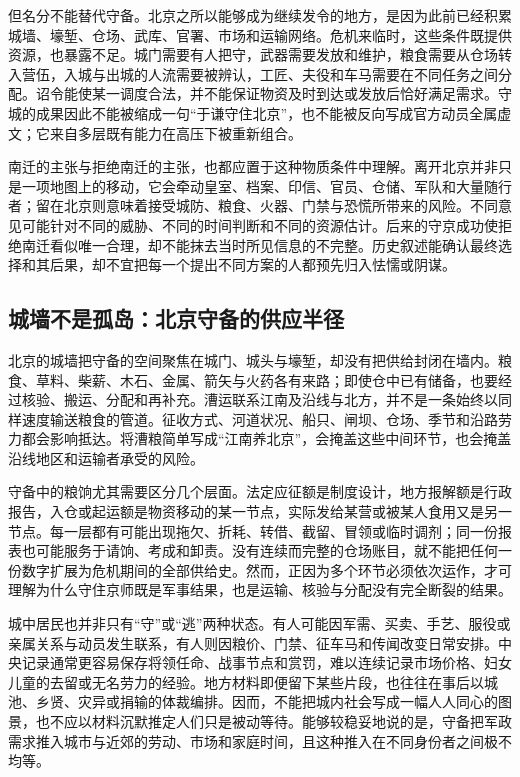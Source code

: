 但名分不能替代守备。北京之所以能够成为继续发令的地方，是因为此前已经积累城墙、壕堑、仓场、武库、官署、市场和运输网络。危机来临时，这些条件既提供资源，也暴露不足。城门需要有人把守，武器需要发放和维护，粮食需要从仓场转入营伍，入城与出城的人流需要被辨认，工匠、夫役和车马需要在不同任务之间分配。诏令能使某一调度合法，并不能保证物资及时到达或发放后恰好满足需求。守城的成果因此不能被缩成一句“于谦守住北京”，也不能被反向写成官方动员全属虚文；它来自多层既有能力在高压下被重新组合。

南迁的主张与拒绝南迁的主张，也都应置于这种物质条件中理解。离开北京并非只是一项地图上的移动，它会牵动皇室、档案、印信、官员、仓储、军队和大量随行者；留在北京则意味着接受城防、粮食、火器、门禁与恐慌所带来的风险。不同意见可能针对不同的威胁、不同的时间判断和不同的资源估计。后来的守京成功使拒绝南迁看似唯一合理，却不能抹去当时所见信息的不完整。历史叙述能确认最终选择和其后果，却不宜把每一个提出不同方案的人都预先归入怯懦或阴谋。

\subsection{城墙不是孤岛：北京守备的供应半径}

北京的城墙把守备的空间聚焦在城门、城头与壕堑，却没有把供给封闭在墙内。粮食、草料、柴薪、木石、金属、箭矢与火药各有来路；即使仓中已有储备，也要经过核验、搬运、分配和再补充。漕运联系江南及沿线与北方，并不是一条始终以同样速度输送粮食的管道。征收方式、河道状况、船只、闸坝、仓场、季节和沿路劳力都会影响抵达。将漕粮简单写成“江南养北京”，会掩盖这些中间环节，也会掩盖沿线地区和运输者承受的风险。

守备中的粮饷尤其需要区分几个层面。法定应征额是制度设计，地方报解额是行政报告，入仓或起运额是物资移动的某一节点，实际发给某营或被某人食用又是另一节点。每一层都有可能出现拖欠、折耗、转借、截留、冒领或临时调剂；同一份报表也可能服务于请饷、考成和卸责。没有连续而完整的仓场账目，就不能把任何一份数字扩展为危机期间的全部供给史。然而，正因为多个环节必须依次运作，才可理解为什么守住京师既是军事结果，也是运输、核验与分配没有完全断裂的结果。

城中居民也并非只有“守”或“逃”两种状态。有人可能因军需、买卖、手艺、服役或亲属关系与动员发生联系，有人则因粮价、门禁、征车马和传闻改变日常安排。中央记录通常更容易保存将领任命、战事节点和赏罚，难以连续记录市场价格、妇女儿童的去留或无名劳力的经验。地方材料即便留下某些片段，也往往在事后以城池、乡贤、灾异或捐输的体裁编排。因而，不能把城内社会写成一幅人人同心的图景，也不应以材料沉默推定人们只是被动等待。能够较稳妥地说的是，守备把军政需求推入城市与近郊的劳动、市场和家庭时间，且这种推入在不同身份者之间极不均等。

